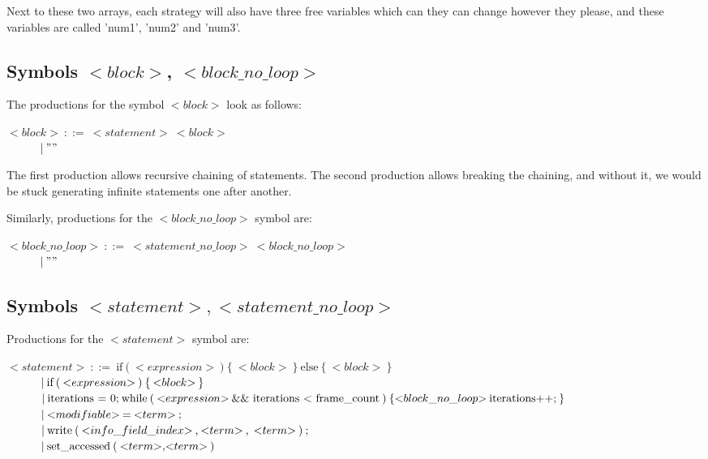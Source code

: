 Next to these two arrays, each strategy will also have three free variables which can they can change however they please, and these variables are called 'num1', 'num2' and 'num3'.

\subsection{Symbols ${<}block{>}$, ${<}block\_no\_loop{>}$}
The productions for the symbol ${<}block{>}$ look as follows:

\noindent
$ {<}block{>}\:::=\:{<}statement{>}\:{<}block{>}$\\
$ \indent\indent |\:""$

The first production allows recursive chaining of statements. The second production allows breaking the chaining, and without it, we would be stuck generating infinite statements one after another.

Similarly, productions for the ${<}block\_no\_loop{>}$ symbol are:

\noindent
$ {<}block\_no\_loop{>}\:::=\:{<}statement\_no\_loop{>}\:{<}block\_no\_loop{>}$\\
$ \indent\indent |\:""$

\subsection{Symbols ${<}statement{>}, {<}statement\_no\_loop{>}$}
Productions for the ${<}statement{>}$ symbol are:

\noindent
$ {<}statement{>}\:::=\:\text{if}\:\text{(}\:{<}expression{>}\:\text{)}\:\text{\{}\:{<}block{>}\:\text{\}}\:\text{else}\:\text{\{}\:{<}block{>}\:\text{\}} $\\
$ \indent\indent |\:\text{if}\:\text{(}\:{<}expression{>}\:\text{)}\:\text{\{}\:{<}block{>}\:\text{\}}$\\
$ \indent\indent |\:\text{iterations = 0;}\:\text{while}\:\text{(}\:{<}expression{>}\:\text{\&\& iterations < frame\_count}\:\text{)}\:\text{\{}\:\\{<}block\_no\_loop{>}\:\text{iterations++;}\:\text{\}} $\\
$ \indent\indent |\:{<}modifiable{>}\:\text{=}\:{<}term{>}\:\text{;} $\\
$ \indent\indent |\:\text{write}\:\text{(}\:{<}info\_field\_index{>}\:\text{,}\:{<}term{>}\:\text{,}\:\:{<}term{>}\:\text{)}\:\text{;} $\\
$ \indent\indent |\:\text{set\_accessed}\:\text{(}\:{<}term{>}\text{,}{<}term{>}\:\text{)}$

